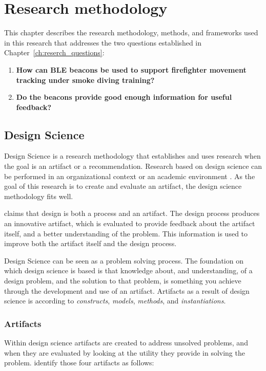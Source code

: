 \documentclass[../Main/thesis.tex]{subfiles}
\begin{document}
\chapter{Research methodology}
\label{ch:research_methodology}
This chapter describes the research methodology, methods, and frameworks used in this research that addresses the two questions established in Chapter~\ref{ch:reserch_questions}:

\begin{enumerate}
	\item \textbf{How can BLE beacons be used to support firefighter movement tracking under smoke diving training?}
	\item \textbf{Do the beacons provide good enough information for useful feedback?}
\end{enumerate}

\section{Design Science}
Design Science is a research methodology that establishes and uses research when the goal is an artifact or a recommendation.
Research based on design science can be performed in an organizational context or an academic environment \citep{lacerda2015design}.
As the goal of this research is to create and evaluate an artifact, the design science methodology fits well.

\citet{hevner2004design} claims that design is both a process and an artifact.
The design process produces an innovative artifact, which is evaluated to provide feedback about the artifact itself, and a better understanding of the problem. 
This information is used to improve both the artifact itself and the design process.

Design Science can be seen as a problem solving process.
The foundation on which design science is based is that knowledge about, and understanding, of a design problem, and the solution to that problem, is something you achieve through the development and use of an artifact.
Artifacts as a result of design science is according to \citet{March1995} \textit{constructs}, \textit{models}, \textit{methods}, and \textit{instantiations}.


\subsection{Artifacts}
Within design science artifacts are created to address unsolved problems, and when they are evaluated by looking at the utility they provide in solving the problem.
\citet[p.78-79]{hevner2004design} identify those four artifacts as follows:
\end{document}
